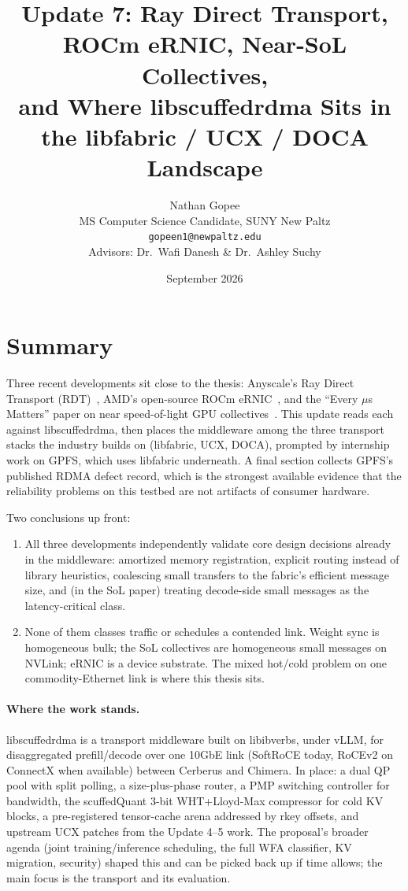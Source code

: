 \documentclass[11pt,letterpaper]{article}
\title{Update 7: Ray Direct Transport, ROCm eRNIC, Near-SoL Collectives,\\[2pt] and Where libscuffedrdma Sits in the libfabric / UCX / DOCA Landscape}
\author{Nathan Gopee\\MS Computer Science Candidate, SUNY New Paltz\\\texttt{gopeen1@newpaltz.edu}\\[4pt]Advisors: Dr.\ Wafi Danesh \& Dr.\ Ashley Suchy}
\date{September 2026}
\begin{document}
\maketitle

\tableofcontents

\section{Summary}

Three recent developments sit close to the thesis: Anyscale's Ray Direct Transport (RDT)~\cite{anyscale_rdt2,anyscale_rdt1}, AMD's open-source ROCm eRNIC~\cite{rocm_ernic}, and the ``Every $\mu$s Matters'' paper on near speed-of-light GPU collectives~\cite{sol2026}. This update reads each against libscuffedrdma, then places the middleware among the three transport stacks the industry builds on (libfabric, UCX, DOCA), prompted by internship work on GPFS, which uses libfabric underneath. A final section collects GPFS's published RDMA defect record, which is the strongest available evidence that the reliability problems on this testbed are not artifacts of consumer hardware.

Two conclusions up front:

\begin{enumerate}
\item All three developments independently validate core design decisions already in the middleware: amortized memory registration, explicit routing instead of library heuristics, coalescing small transfers to the fabric's efficient message size, and (in the SoL paper) treating decode-side small messages as the latency-critical class.
\item None of them classes traffic or schedules a contended link. Weight sync is homogeneous bulk; the SoL collectives are homogeneous small messages on NVLink; eRNIC is a device substrate. The mixed hot/cold problem on one commodity-Ethernet link is where this thesis sits.
\end{enumerate}

\paragraph{Where the work stands.} libscuffedrdma is a transport middleware built on libibverbs, under vLLM, for disaggregated prefill/decode over one 10GbE link (SoftRoCE today, RoCEv2 on ConnectX when available) between Cerberus and Chimera. In place: a dual QP pool with split polling, a size-plus-phase router, a PMP switching controller for bandwidth, the scuffedQuant 3-bit WHT+Lloyd-Max compressor for cold KV blocks, a pre-registered tensor-cache arena addressed by rkey offsets, and upstream UCX patches from the Update 4--5 work. The proposal's broader agenda (joint training/inference scheduling, the full WFA classifier, KV migration, security) shaped this and can be picked back up if time allows; the main focus is the transport and its evaluation.
\end{document}
